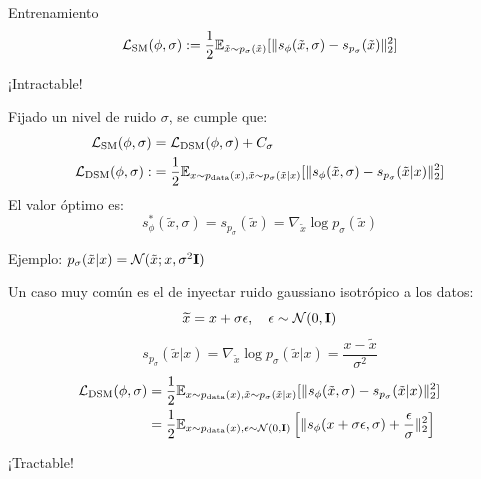 \documentclass{beamer}
\begin{document}
\begin{frame}{Entrenamiento}
    \begin{equation*}
        \mathcal{L}_{\text{SM}}(\phi,\sigma) := \frac{1}{2}\mathbb{E}_{\tilde{x}\sim p_\sigma(\tilde{x})}[\|s_\phi(\tilde{x},\sigma) - s_{p_\sigma}(\tilde{x})\|_2^2]
    \end{equation*}\pause\vspace{-0.8cm}
    \begin{center}
        {\color{red} ¡Intractable!}
    \end{center}
    \pause
    \begin{theorem}
        Fijado un nivel de ruido $\sigma$, se cumple que:
        \begin{align*}
            \mathcal{L}_\text{SM}(\phi,\sigma) &= \mathcal{L}_\text{DSM}(\phi,\sigma) + C_\sigma\\
            \mathcal{L}_\text{DSM}(\phi,\sigma) :&= \frac{1}{2}\mathbb{E}_{x\sim p_{\text{data}}(x), \tilde{x}\sim p_\sigma(\tilde{x}|x)}[\|s_\phi(\tilde{x},\sigma) - s_{p_\sigma}(\tilde{x}|x)\|_2^2]
        \end{align*}\pause
        El valor óptimo es:
        \begin{equation*}
            s_\phi^*(\tilde{x},\sigma) = s_{p_\sigma}(\tilde{x}) = \nabla_{\tilde{x}}\log p_\sigma(\tilde{x})
        \end{equation*}
    \end{theorem}
\end{frame}

\begin{frame}{Ejemplo: $p_\sigma(\tilde{x}|x) = \mathcal{N}(\tilde{x};x,\sigma^2\mathbf{I})$}

    Un caso muy común es el de inyectar ruido gaussiano isotrópico a los datos:
    \begin{equation*}
        \widetilde{x} = x + \sigma \epsilon, \quad \epsilon \sim \mathcal{N}(0,\mathbf{I})
    \end{equation*}\pause
    \begin{equation*}
        s_{p_\sigma}(\tilde{x}|x) = \nabla_{\tilde{x}}\log p_\sigma(\tilde{x}|x) = \frac{x-\tilde{x}}{\sigma^2}
    \end{equation*} \pause
    \begin{align*}
        \mathcal{L}_\text{DSM}(\phi,\sigma) &= \frac{1}{2}\mathbb{E}_{x\sim p_{\text{data}}(x), \tilde{x}\sim p_\sigma(\tilde{x}|x)}[\|s_\phi(\tilde{x},\sigma) - s_{p_\sigma}(\tilde{x}|x)\|_2^2] \\
        &= \frac{1}{2}\mathbb{E}_{x\sim p_{\text{data}}(x), \epsilon\sim \mathcal{N}(0,\mathbf{I})}\left[\|s_\phi(x+\sigma\epsilon,\sigma) + \frac{\epsilon}{\sigma}\|_2^2\right]
    \end{align*}\pause
    \begin{center}
        {\color{green!50!black} ¡Tractable!}
    \end{center}
\end{frame}
\end{document}
